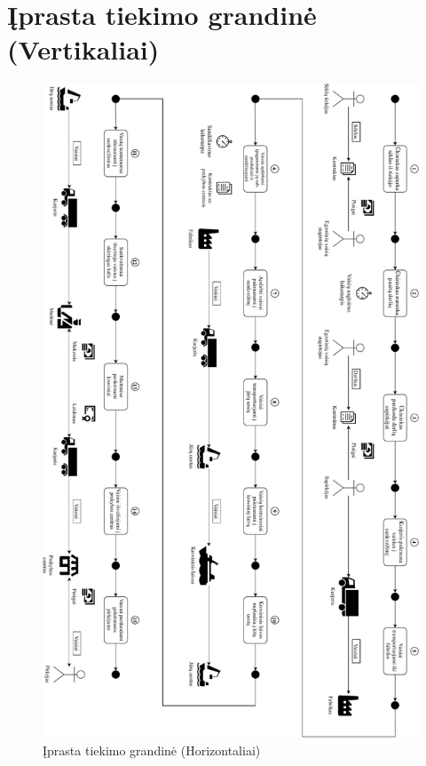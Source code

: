 \appendix  

\section{Įprasta tiekimo grandinė (Vertikaliai)}
\begin{figure}[H]
    \centering
    \includegraphics[scale=0.50]{images/supply-chain-vertical}
    \caption{Įprasta tiekimo grandinė (Horizontaliai)}
\end{figure}

